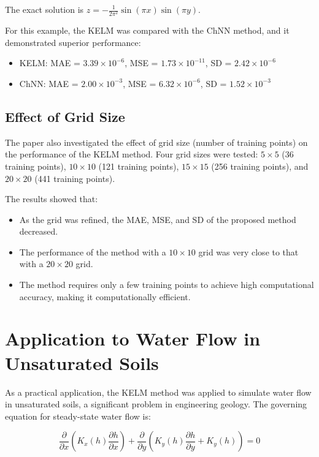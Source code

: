 \documentclass[11pt,a4paper]{article}
\begin{document}
The exact solution is $z = -\frac{1}{2\pi^2} \sin(\pi x) \sin(\pi y)$.

For this example, the KELM was compared with the ChNN method, and it demonstrated superior performance:

\begin{itemize}
    \item KELM: MAE = $3.39 \times 10^{-6}$, MSE = $1.73 \times 10^{-11}$, SD = $2.42 \times 10^{-6}$
    \item ChNN: MAE = $2.00 \times 10^{-3}$, MSE = $6.32 \times 10^{-6}$, SD = $1.52 \times 10^{-3}$
\end{itemize}

\subsection{Effect of Grid Size}
The paper also investigated the effect of grid size (number of training points) on the performance of the KELM method. Four grid sizes were tested: $5 \times 5$ (36 training points), $10 \times 10$ (121 training points), $15 \times 15$ (256 training points), and $20 \times 20$ (441 training points).

The results showed that:
\begin{itemize}
    \item As the grid was refined, the MAE, MSE, and SD of the proposed method decreased.
    \item The performance of the method with a $10 \times 10$ grid was very close to that with a $20 \times 20$ grid.
    \item The method requires only a few training points to achieve high computational accuracy, making it computationally efficient.
\end{itemize}

\section{Application to Water Flow in Unsaturated Soils}

As a practical application, the KELM method was applied to simulate water flow in unsaturated soils, a significant problem in engineering geology. The governing equation for steady-state water flow is:

\begin{equation}
\frac{\partial}{\partial x}\left(K_x(h)\frac{\partial h}{\partial x}\right) + \frac{\partial}{\partial y}\left(K_y(h)\frac{\partial h}{\partial y} + K_y(h)\right) = 0
\end{equation}
\end{document}
